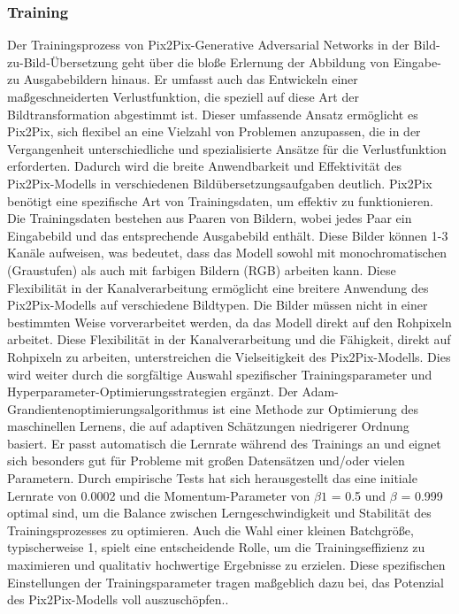\subsubsection{Training}

Der Trainingsprozess von Pix2Pix-Generative Adversarial Networks in der Bild-zu-Bild-Übersetzung geht über die bloße Erlernung der Abbildung von Eingabe- zu Ausgabebildern hinaus. Er umfasst auch das Entwickeln einer maßgeschneiderten Verlustfunktion, die speziell auf diese Art der Bildtransformation abgestimmt ist. Dieser umfassende Ansatz ermöglicht es Pix2Pix, sich flexibel an eine Vielzahl von Problemen anzupassen, die in der Vergangenheit unterschiedliche und spezialisierte Ansätze für die Verlustfunktion erforderten. Dadurch wird die breite Anwendbarkeit und Effektivität des Pix2Pix-Modells in verschiedenen Bildübersetzungsaufgaben deutlich. Pix2Pix benötigt eine spezifische Art von Trainingsdaten, um effektiv zu funktionieren. Die Trainingsdaten bestehen aus Paaren von Bildern, wobei jedes Paar ein Eingabebild und das entsprechende Ausgabebild enthält. Diese Bilder können 1-3 Kanäle aufweisen, was bedeutet, dass das Modell sowohl mit monochromatischen (Graustufen) als auch mit farbigen Bildern (RGB) arbeiten kann. Diese Flexibilität in der Kanalverarbeitung ermöglicht eine breitere Anwendung des Pix2Pix-Modells auf verschiedene Bildtypen. Die Bilder müssen nicht in einer bestimmten Weise vorverarbeitet werden, da das Modell direkt auf den Rohpixeln arbeitet. Diese Flexibilität in der Kanalverarbeitung und die Fähigkeit, direkt auf Rohpixeln zu arbeiten, unterstreichen die Vielseitigkeit des Pix2Pix-Modells. Dies wird weiter durch die sorgfältige Auswahl spezifischer Trainingsparameter und Hyperparameter-Optimierungsstrategien ergänzt. Der Adam-Grandientenoptimierungsalgorithmus ist eine Methode zur Optimierung des maschinellen Lernens, die auf adaptiven Schätzungen niedrigerer Ordnung basiert. Er passt automatisch die Lernrate während des Trainings an und eignet sich besonders gut für Probleme mit großen Datensätzen und/oder vielen Parametern. Durch empirische Tests hat sich herausgestellt das eine initiale Lernrate von 0.0002 und die Momentum-Parameter von $\beta1$ = 0.5 und $\beta$ = 0.999 optimal sind, um die Balance zwischen Lerngeschwindigkeit und Stabilität des Trainingsprozesses zu optimieren. Auch die Wahl einer kleinen Batchgröße, typischerweise 1, spielt eine entscheidende Rolle, um die Trainingseffizienz zu maximieren und qualitativ hochwertige Ergebnisse zu erzielen. Diese spezifischen Einstellungen der Trainingsparameter tragen maßgeblich dazu bei, das Potenzial des Pix2Pix-Modells voll auszuschöpfen.\cite{Isola}.\newline
